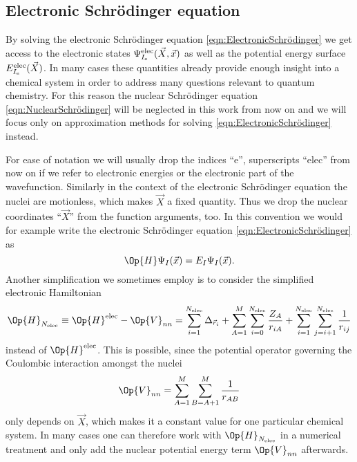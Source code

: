 \subsection{Electronic Schrödinger equation}
\label{sec:ElectronicSchrödinger}
By solving the electronic Schrödinger equation \eqref{eqn:ElectronicSchrödinger}
we get access to the electronic states $\Psi^\text{elec}_{I_\text{e}}(\vec{X}, \vec{x})$
as well as the potential energy surface $E^\text{elec}_{I_\text{e}}(\vec{X})$.
In many cases these quantities already provide
enough insight into a chemical system in order to address many
questions relevant to quantum chemistry.
For this reason the nuclear Schrödinger equation \eqref{eqn:NuclearSchrödinger}
will be neglected in this work from now on
and we will focus only
on approximation methods for solving \eqref{eqn:ElectronicSchrödinger} instead.

For ease of notation we will usually drop the indices ``e'',
superscripts ``elec'' from now on if we refer to electronic energies
or the electronic part of the wavefunction.
Similarly in the context of the electronic Schrödinger equation
the nuclei are motionless, which makes $\vec{X}$ a fixed quantity.
Thus we drop the nuclear coordinates ``$\vec{X}$''
from the function arguments, too.
In this convention we would for example
write the electronic Schrödinger equation \eqref{eqn:ElectronicSchrödinger} as
\[ \Op{H} \Psi_I(\vec{x}) = E_I \Psi_I(\vec{x}). \]
Another simplification we sometimes employ is to consider
the simplified electronic Hamiltonian
\begin{equation}
	\Op{H}_{\Nelec} \equiv \Op{H}^\text{elec} - \Op{V}_{nn}
	= \sum_{i=1}^{\Nelec} \Delta_{\vec{r}_i}
	+ \sum_{A=1}^M \sum_{i=0}^{\Nelec} \frac{Z_A}{r_{iA}}
	+ \sum_{i=1}^{\Nelec} \sum_{j=i+1}^{\Nelec} \frac{1}{r_{ij}}
	\label{eqn:ElectronicHamiltonian}
\end{equation}
instead of $\Op{H}^\text{elec}$.
This is possible, since the potential operator governing the Coulombic interaction
amongst the nuclei
\[
	\Op{V}_{nn} = \sum_{A=1}^M \sum_{B=A+1}^M \frac1{r_{AB}}
\]
only depends on $\vec{X}$, which makes it a constant value for one particular chemical system.
In many cases one can therefore work with $\Op{H}_{\Nelec}$
in a numerical treatment and only add the nuclear potential energy term $\Op{V}_{nn}$
afterwards.

